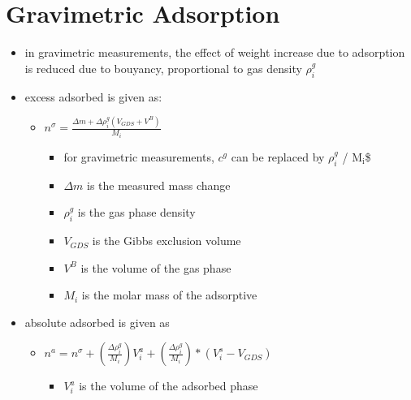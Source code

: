 \documentclass[11pt]{article}
\begin{document}
\section{Gravimetric Adsorption}
\label{sec:orgb89db3d}
\begin{itemize}
\item in gravimetric measurements, the effect of weight increase due to adsorption is reduced due to bouyancy, proportional to gas density \(\rho _i ^g\) \cite{Rouquerol2016}
\item excess adsorbed is given as:
\begin{itemize}
\item \(n ^{\sigma} = \frac{\Delta m + \Delta \rho _i ^g (V _{GDS} + V ^B)}{M_i}\)
\begin{itemize}
\item for gravimetric measurements, \(c ^g\) can be replaced by \(\rho _i ^g\) / M\(_{\text{i}}\)\$
\item \(\Delta m\) is the measured mass change
\item \(\rho _i ^g\) is the gas phase density
\item \(V _{GDS}\) is the Gibbs exclusion volume
\item \(V ^B\) is the volume of the gas phase
\item \(M _i\) is the molar mass of the adsorptive
\end{itemize}
\end{itemize}
\item absolute adsorbed is given as
\begin{itemize}
\item \(n ^a = n ^{\sigma} + (\frac{\Delta \rho _i ^g}{M _i}) V _i ^a + (\frac{\Delta \rho _i ^g}{M _i})*(V _i ^s - V_{GDS})\)
\begin{itemize}
\item \(V _i ^a\) is the volume of the adsorbed phase
\end{itemize}
\end{itemize}
\end{itemize}
\end{document}
